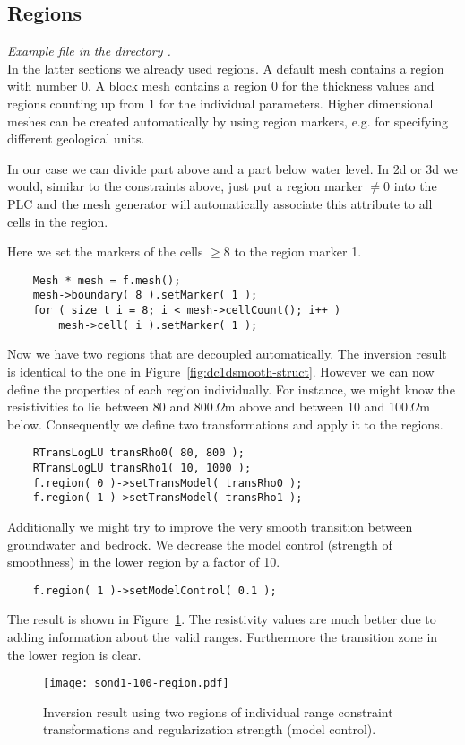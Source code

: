 \subsection{Regions}\label{sec:dc1dregion}
{\em Example file  in the directory .}\\
In the latter sections we already used regions.
A default mesh contains a region with number 0.
A block mesh contains a region 0 for the thickness values and regions counting up from 1 for the individual parameters.
Higher dimensional meshes can be created automatically by using region markers, e.g. for specifying different geological units.

In our case we can divide part above and a part below water level.
In 2d or 3d we would, similar to the constraints above, just put a region marker $\neq 0$ into the PLC and the mesh generator will automatically associate this attribute to all cells in the region.

Here we set the markers of the cells $\geq8$ to the region marker 1.
\begin{lstlisting}
    Mesh * mesh = f.mesh();
    mesh->boundary( 8 ).setMarker( 1 );
    for ( size_t i = 8; i < mesh->cellCount(); i++ ) 
        mesh->cell( i ).setMarker( 1 );
\end{lstlisting}

Now we have two regions that are decoupled automatically.
The inversion result is identical to the one in Figure~\ref{fig:dc1dsmooth-struct}.
However we can now define the properties of each region individually.
For instance, we might know the resistivities to lie between 80 and 800\,$\Omega$m above and between 10 and 100\,$\Omega$m below.
Consequently we define two transformations and apply it to the regions.
\begin{lstlisting}
    RTransLogLU transRho0( 80, 800 );
    RTransLogLU transRho1( 10, 1000 );
    f.region( 0 )->setTransModel( transRho0 );
    f.region( 1 )->setTransModel( transRho1 );
\end{lstlisting}

Additionally we might try to improve the very smooth transition between groundwater and bedrock.
We decrease the model control (strength of smoothness) in the lower region by a factor of 10.
\begin{lstlisting}
    f.region( 1 )->setModelControl( 0.1 );
\end{lstlisting}

The result is shown in Figure~\ref{fig:dc1dsmooth-region}.
The resistivity values are much better due to adding information about the valid ranges.
Furthermore the transition zone in the lower region is clear.
\begin{figure}[htbp]
\centering\texttt{[image: sond1-100-region.pdf]}
\caption{Inversion result using two regions of individual range constraint transformations and regularization strength (model control).}%
\label{fig:dc1dsmooth-region}
\end{figure}
